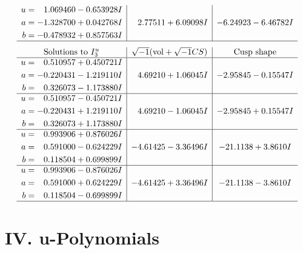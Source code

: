 \documentclass[1p]{elsarticle_modified}
\theoremstyle{definition}
\newcommand{\I}{\sqrt{-1}}
\begin{document}
$$\begin{array}{c|c|c}
\begin{aligned}
u &= \phantom{-}1.069460 - 0.653928 I \\
a &= -1.328700 + 0.042768 I \\
b &= -0.478932 + 0.857563 I\end{aligned}
 & \phantom{-}2.77511 + 6.09098 I & -6.24923 - 6.46782 I\\
 \hline 
 \end{array}$$\newpage$$\begin{array}{c|c|c}  
\text{Solutions to }I^u_{3}& \I (\text{vol} + \sqrt{-1}CS) & \text{Cusp shape}\\
 \hline 
\begin{aligned}
u &= \phantom{-}0.510957 + 0.450721 I \\
a &= -0.220431 - 1.219110 I \\
b &= \phantom{-}0.326073 - 1.173880 I\end{aligned}
 & \phantom{-}4.69210 + 1.06045 I & -2.95845 - 0.15547 I \\ \hline\begin{aligned}
u &= \phantom{-}0.510957 - 0.450721 I \\
a &= -0.220431 + 1.219110 I \\
b &= \phantom{-}0.326073 + 1.173880 I\end{aligned}
 & \phantom{-}4.69210 - 1.06045 I & -2.95845 + 0.15547 I \\ \hline\begin{aligned}
u &= \phantom{-}0.993906 + 0.876026 I \\
a &= \phantom{-}0.591000 - 0.624229 I \\
b &= \phantom{-}0.118504 + 0.699899 I\end{aligned}
 & -4.61425 - 3.36496 I & -21.1138 + 3.8610 I \\ \hline\begin{aligned}
u &= \phantom{-}0.993906 - 0.876026 I \\
a &= \phantom{-}0.591000 + 0.624229 I \\
b &= \phantom{-}0.118504 - 0.699899 I\end{aligned}
 & -4.61425 + 3.36496 I & -21.1138 - 3.8610 I\\
 \hline 
 \end{array}$$\newpage
\newpage\renewcommand{\arraystretch}{1}
\centering \section*{ IV. u-Polynomials}
\end{document}
